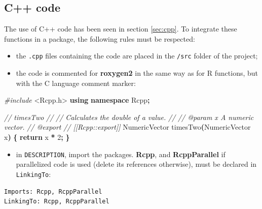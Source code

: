 \documentclass[
  12pt,
  american,
  a4paper,
  extrafontsizes,onecolumn,openright
  ]{memoir}
\newenvironment{Shaded}{\begin{snugshade}}{\end{snugshade}}
\newcommand{\CommentTok}[1]{\textcolor[rgb]{0.56,0.35,0.01}{\textit{#1}}}
\newcommand{\ControlFlowTok}[1]{\textcolor[rgb]{0.13,0.29,0.53}{\textbf{#1}}}
\newcommand{\DecValTok}[1]{\textcolor[rgb]{0.00,0.00,0.81}{#1}}
\newcommand{\ImportTok}[1]{#1}
\newcommand{\KeywordTok}[1]{\textcolor[rgb]{0.13,0.29,0.53}{\textbf{#1}}}
\newcommand{\NormalTok}[1]{#1}
\newcommand{\OperatorTok}[1]{\textcolor[rgb]{0.81,0.36,0.00}{\textbf{#1}}}
\newcommand{\PreprocessorTok}[1]{\textcolor[rgb]{0.56,0.35,0.01}{\textit{#1}}}
\providecommand{\tightlist}{%
  \setlength{\itemsep}{0pt}\setlength{\parskip}{0pt}}
\begin{document}
\hypertarget{c-code}{%
\subsection{C++ code}\label{c-code}}

The use of C++ code has been seen in section \ref{sec:cpp}.
To integrate these functions in a package, the following rules must be respected:

\begin{itemize}
\tightlist
\item
  the \texttt{.cpp} files containing the code are placed in the \texttt{/src} folder of the project;
\item
  the code is commented for \textbf{roxygen2} in the same way as for R functions, but with the C language comment marker:
\end{itemize}

\scriptsize

\begin{Shaded}
\begin{Highlighting}[]
\PreprocessorTok{\#include }\ImportTok{\textless{}Rcpp.h\textgreater{}}
\KeywordTok{using} \KeywordTok{namespace}\NormalTok{ Rcpp}\OperatorTok{;}

\CommentTok{//\textquotesingle{} timesTwo}
\CommentTok{//\textquotesingle{}}
\CommentTok{//\textquotesingle{} Calculates the double of a value.}
\CommentTok{//\textquotesingle{}}
\CommentTok{//\textquotesingle{} @param x A numeric vector.}
\CommentTok{//\textquotesingle{} @export}
\CommentTok{// [[Rcpp::export]]}
\NormalTok{NumericVector timesTwo}\OperatorTok{(}\NormalTok{NumericVector x}\OperatorTok{)} \OperatorTok{\{}
  \ControlFlowTok{return}\NormalTok{ x }\OperatorTok{*} \DecValTok{2}\OperatorTok{;}
\OperatorTok{\}}
\end{Highlighting}
\end{Shaded}

\normalsize

\begin{itemize}
\tightlist
\item
  in \texttt{DESCRIPTION}, import the packages.
  \textbf{Rcpp}, and \textbf{RcppParallel} if parallelized code is used (delete its references otherwise), must be declared in \texttt{LinkingTo}:
\end{itemize}

\begin{verbatim}
Imports: Rcpp, RcppParallel
LinkingTo: Rcpp, RcppParallel
\end{verbatim}
\end{document}
